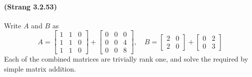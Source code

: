\documentclass[10pt]{article}
\begin{document}
\paragraph{(Strang 3.2.53)}
Write $A$ and $B$ as 
\[A =
\begin{bmatrix}
	1& 1& 0\\
	1& 1& 0\\
	1& 1& 0
\end{bmatrix}+
\begin{bmatrix}
	0& 0& 0\\
	0& 0& 4\\
	0& 0& 8
\end{bmatrix},\quad 
B = \begin{bmatrix}2&0\\2& 0\end{bmatrix} + 
\begin{bmatrix}0&2\\0& 3\end{bmatrix}\]
Each of the combined matrices are trivially rank one, and solve the required by simple matrix addition.
\end{document}
